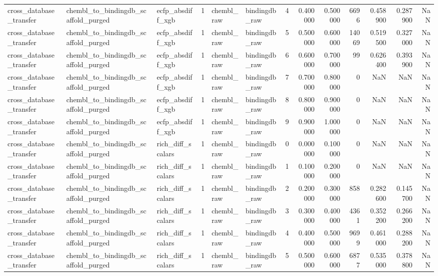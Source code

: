 \begin{longtable}{lllrllrrrrrrr}
cross\_database\_transfer & chembl\_to\_bindingdb\_scaffold\_purged & ecfp\_absdiff\_xgb & 1 & chembl\_raw & bindingdb\_raw & 4 & 0.400000 & 0.500000 & 6696 & 0.458900 & 0.287900 & NaN \\
cross\_database\_transfer & chembl\_to\_bindingdb\_scaffold\_purged & ecfp\_absdiff\_xgb & 1 & chembl\_raw & bindingdb\_raw & 5 & 0.500000 & 0.600000 & 14069 & 0.519500 & 0.327000 & NaN \\
cross\_database\_transfer & chembl\_to\_bindingdb\_scaffold\_purged & ecfp\_absdiff\_xgb & 1 & chembl\_raw & bindingdb\_raw & 6 & 0.600000 & 0.700000 & 99 & 0.626400 & 0.393900 & NaN \\
cross\_database\_transfer & chembl\_to\_bindingdb\_scaffold\_purged & ecfp\_absdiff\_xgb & 1 & chembl\_raw & bindingdb\_raw & 7 & 0.700000 & 0.800000 & 0 & NaN & NaN & NaN \\
cross\_database\_transfer & chembl\_to\_bindingdb\_scaffold\_purged & ecfp\_absdiff\_xgb & 1 & chembl\_raw & bindingdb\_raw & 8 & 0.800000 & 0.900000 & 0 & NaN & NaN & NaN \\
cross\_database\_transfer & chembl\_to\_bindingdb\_scaffold\_purged & ecfp\_absdiff\_xgb & 1 & chembl\_raw & bindingdb\_raw & 9 & 0.900000 & 1.000000 & 0 & NaN & NaN & NaN \\
cross\_database\_transfer & chembl\_to\_bindingdb\_scaffold\_purged & rich\_diff\_scalars & 1 & chembl\_raw & bindingdb\_raw & 0 & 0.000000 & 0.100000 & 0 & NaN & NaN & NaN \\
cross\_database\_transfer & chembl\_to\_bindingdb\_scaffold\_purged & rich\_diff\_scalars & 1 & chembl\_raw & bindingdb\_raw & 1 & 0.100000 & 0.200000 & 0 & NaN & NaN & NaN \\
cross\_database\_transfer & chembl\_to\_bindingdb\_scaffold\_purged & rich\_diff\_scalars & 1 & chembl\_raw & bindingdb\_raw & 2 & 0.200000 & 0.300000 & 858 & 0.282600 & 0.145700 & NaN \\
cross\_database\_transfer & chembl\_to\_bindingdb\_scaffold\_purged & rich\_diff\_scalars & 1 & chembl\_raw & bindingdb\_raw & 3 & 0.300000 & 0.400000 & 4361 & 0.352200 & 0.266200 & NaN \\
cross\_database\_transfer & chembl\_to\_bindingdb\_scaffold\_purged & rich\_diff\_scalars & 1 & chembl\_raw & bindingdb\_raw & 4 & 0.400000 & 0.500000 & 9699 & 0.461000 & 0.288200 & NaN \\
cross\_database\_transfer & chembl\_to\_bindingdb\_scaffold\_purged & rich\_diff\_scalars & 1 & chembl\_raw & bindingdb\_raw & 5 & 0.500000 & 0.600000 & 6877 & 0.535000 & 0.378800 & NaN \\

\end{longtable}
